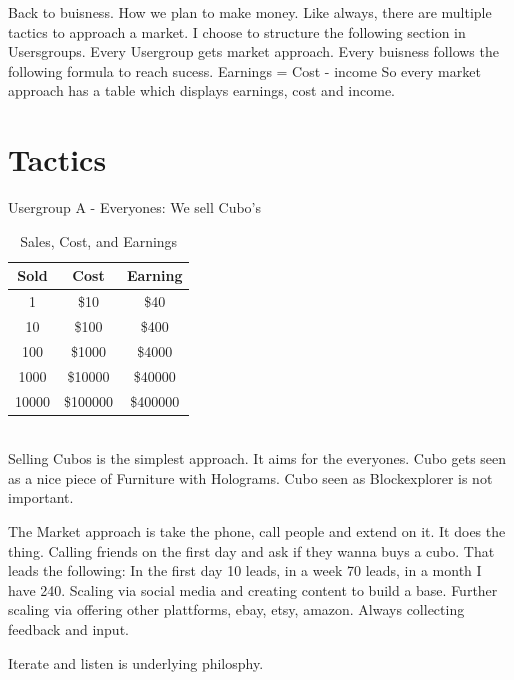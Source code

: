 \documentclass{report}
\begin{document}
Back to buisness. How we plan to make money.
Like always, there are multiple tactics to approach a market.
I choose to structure the following section in Usersgroups.
Every Usergroup gets market approach.
Every buisness follows the following formula to reach sucess.
Earnings = Cost - income
So every market approach has a table which displays earnings, cost and income.

\newpage

\section{Tactics}

Usergroup A - Everyones: We sell Cubo's
\begin{table}[hbp]
	\centering
	\caption{Sales, Cost, and Earnings}
	\label{tab:sales}
	\begin{tabular}{|c|c|c|}
		\hline
		\textbf{Sold} & \textbf{Cost} & \textbf{Earning} \\
		\hline
		1             & \$10          & \$40             \\
		\hline
		10            & \$100         & \$400            \\
		\hline
		100           & \$1000        & \$4000           \\
		\hline
		1000          & \$10000       & \$40000          \\
		\hline
		10000         & \$100000      & \$400000         \\
		\hline
	\end{tabular}
\end{table}
\\
Selling Cubos is the simplest approach.
It aims for the everyones.
Cubo gets seen as a nice piece of Furniture with Holograms.
Cubo seen as Blockexplorer is not important.

The Market approach is take the phone, call people and extend on it.
It does the thing.
Calling friends on the first day and ask if they wanna buys a cubo.
That leads the following: In the first day 10 leads, in a week 70 leads, in a month I have 240.
Scaling via social media and creating content to build a base.
Further scaling via offering other plattforms, ebay, etsy, amazon.
Always collecting feedback and input.

Iterate and listen is underlying philosphy.

\vspace{2em}
\end{document}
